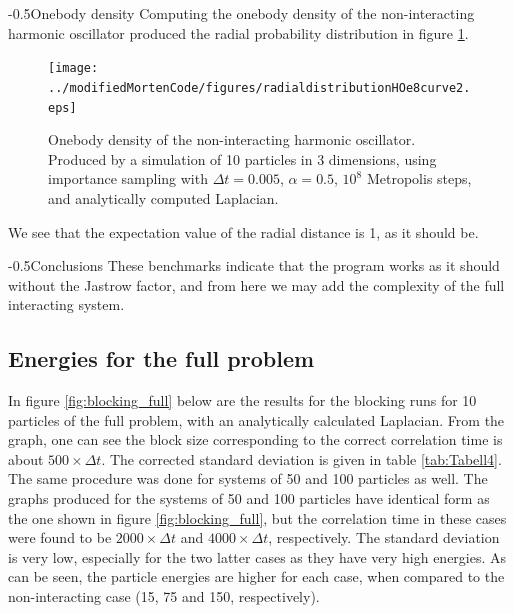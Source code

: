 \documentclass[english, a4paper]{article}
\makeatletter
\renewcommand{\subsubsection}{\@startsection{subsubsection}{3}{0pt}%
{-\baselineskip}{0.5\baselineskip}{\bf\large}}
\makeatother
\begin{document}
\subsubsection{Onebody density}
Computing the onebody density of the non-interacting harmonic oscillator produced the radial probability distribution in figure \ref{fig:radialProbabilityDistributionHO}.
\begin{figure}[H]
	\begin{center}
		\texttt{[image: ../modifiedMortenCode/figures/radialdistributionHOe8curve2.eps]}
		\caption{Onebody density of the non-interacting harmonic oscillator. Produced by a simulation of 10 particles in 3 dimensions, using importance sampling with $\Delta t=0.005$, $\alpha=0.5$, $10^8$ Metropolis steps, and analytically computed Laplacian.}\label{fig:radialProbabilityDistributionHO}
	\end{center}
\end{figure}

We see that the expectation value of the radial distance is 1, as it should be.


\subsubsection{Conclusions}
These benchmarks indicate that the program works as it should without the Jastrow factor, and from here we may add the complexity of the full interacting system.

\subsection{Energies for the full problem}
In figure \ref{fig:blocking_full} below are the results for the blocking runs for 10 particles of the full problem, with an analytically calculated Laplacian. From the graph, one can see the block size corresponding to the correct correlation time is about $500\times\Delta t$. The corrected standard deviation is given in table \ref{tab:Tabell4}. The same procedure was done for systems of 50 and 100 particles as well.
The graphs produced for the systems of 50 and 100 particles have identical form as the one shown in figure \ref{fig:blocking_full}, but the correlation time in these cases were found to be  $2000\times\Delta t$ and $4000\times\Delta t$, respectively.
The standard deviation is very low, especially for the two latter cases as they have very high energies.
As can be seen, the particle energies are higher for each case, when compared to the non-interacting case (15, 75 and 150, respectively).
\end{document}
